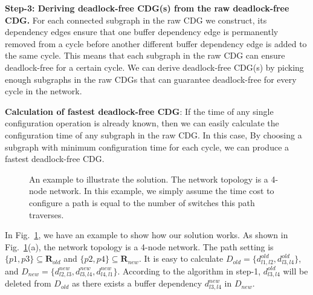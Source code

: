 \textbf{Step-3: Deriving deadlock-free CDG(s) from the raw deadlock-free CDG.}  For each connected subgraph in the raw CDG we construct,  its dependency edges ensure that one buffer dependency edge is permanently removed from a cycle before another different buffer dependency edge is added to the same cycle. This means that each subgraph in the raw CDG can ensure deadlock-free for a certain cycle. We can derive deadlock-free CDG(s)
by picking enough subgraphs in the raw CDGs that can guarantee deadlock-free for every cycle in the network.

\textbf{Calculation of fastest deadlock-free CDG}: If the time of any single configuration operation is already known, then we can easily calculate the configuration time of any subgraph in the raw CDG. In this case, By choosing a subgraph with minimum configuration time for each cycle, we can produce a fastest deadlock-free CDG.

\begin{figure}[t]
	\centering
	
	
	\caption{An example to illustrate the solution. The network topology is a 4-node network. In this example, we simply assume the time cost to configure a path is equal to the number of switches this path traverses.}\label{fig:solution_example}
	\vspace{-0.2in}
\end{figure}

In Fig.~\ref{fig:solution_example}, we have an example to show how our solution works. As shown in Fig.~\ref{fig:solution_example}(a), the network topology is a 4-node network. The path setting is $\{p1, p3\}\subseteq \textbf{R}_{old}$ and $\{p2, p4\}\subseteq \textbf{R}_{new}$. It is easy to calculate $D_{old}=\{d^{old}_{l1,l2},  d^{old}_{l3,l4}\}$, and $D_{new}=\{d^{new}_{l2,l3},  d^{new}_{l3,l4},  d^{new}_{l4,l1}\}$.  According to the algorithm in step-1, $d^{old}_{l3,l4}$ will be deleted from $D_{old}$ as there exists a buffer dependency $d^{new}_{l3,l4}$ in $D_{new}$.

